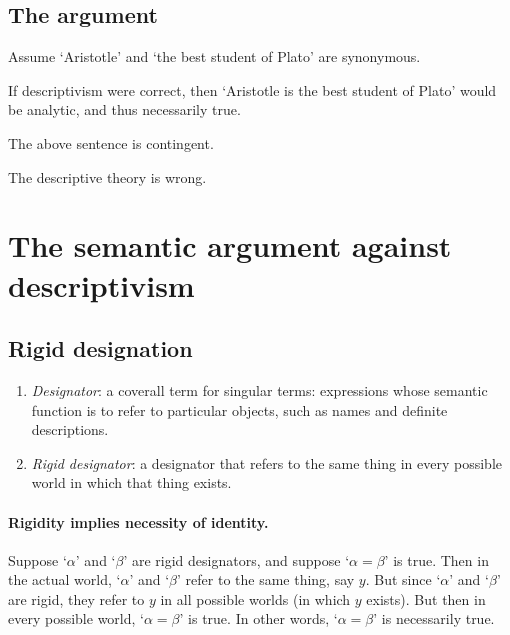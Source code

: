 \subsection{The argument}

\begin{argument}\leavevmode
\begin{premises}
  \item[P0)] Assume `Aristotle' and `the best student of Plato' are synonymous.
  \item[P1)] If descriptivism were correct, then `Aristotle is the best student of Plato' would be analytic, and thus necessarily true.
  \item[P2)] The above sentence is contingent.
  \item[C)] The descriptive theory is wrong.
\end{premises}
\end{argument}

\section{The semantic argument against descriptivism}

\subsection{Rigid designation}

\begin{definition}\leavevmode
\begin{enumerate}[label=\roman*.]
  \item \emph{Designator}: a coverall term for singular terms: expressions whose semantic function is to refer to particular objects, such as names and definite descriptions.
  \item \emph{Rigid designator}: a designator that refers to the same thing in every possible world in which that thing exists.
\end{enumerate}
\end{definition}

\paragraph{Rigidity implies necessity of identity.}
Suppose `$\alpha$' and `$\beta$' are rigid designators, and suppose `$\alpha = \beta$' is true. Then in the actual world, `$\alpha$' and `$\beta$' refer to the same thing, say $y$. But since `$\alpha$' and `$\beta$' are rigid, they refer to $y$ in all possible worlds (in which $y$ exists). But then in every possible world, `$\alpha = \beta$' is true. In other words, `$\alpha = \beta$' is necessarily true.

